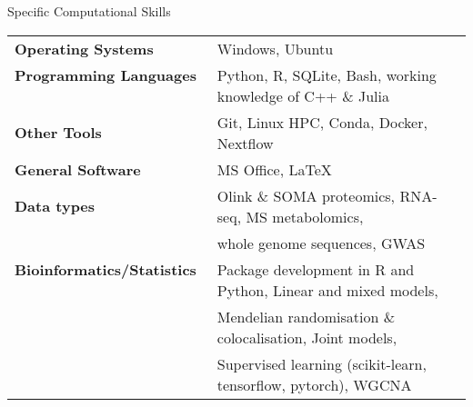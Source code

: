 \documentclass{resume}
\begin{document}
\bigskip \bigskip \bigskip \bigskip \bigskip \bigskip \bigskip \bigskip \bigskip \bigskip \bigskip \bigskip \bigskip
\begin{rSection}{Specific Computational Skills}

\begin{tabular}{ @{} >{\bfseries}l @{\hspace{3ex}} l }
Operating Systems \ & Windows, Ubuntu \vspace{2pt plus 1pt minus 1pt} \\
Programming Languages \ & Python, R, SQLite, Bash, working knowledge of C++ \& Julia \vspace{2pt plus 1pt minus 1pt} \\
Other Tools \ & Git, Linux HPC, Conda, Docker, Nextflow \vspace{2pt plus 1pt minus 1pt}\\
General Software \ & MS Office, \LaTeX  \vspace{2pt plus 1pt minus 1pt} \\
Data types \ & Olink \& SOMA proteomics, RNA-seq, MS metabolomics, \\
    \ & whole genome sequences, GWAS \vspace{2pt plus 1pt minus 1pt} \\ 
Bioinformatics/Statistics \ & Package development in R and Python, Linear and mixed models, \\
    \ & Mendelian randomisation \& colocalisation, Joint models, \\
    \ & Supervised learning (scikit-learn, tensorflow, pytorch), WGCNA \\
\end{tabular}


\end{rSection}
\end{document}
